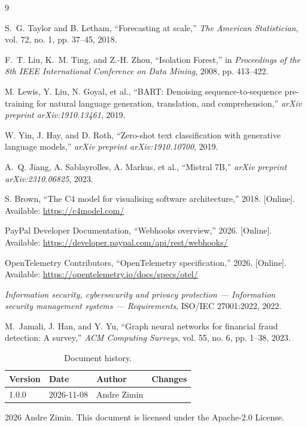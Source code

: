 \documentclass[11pt,a4paper]{article}
\begin{document}
\begin{thebibliography}{9}

S.~G. Taylor and B. Letham, ``Forecasting at scale,'' \emph{The American Statistician}, vol. 72, no. 1, pp. 37--45, 2018.

F.~T. Liu, K.~M. Ting, and Z.-H. Zhou, ``Isolation Forest,'' in \emph{Proceedings of the 8th IEEE International Conference on Data Mining}, 2008, pp. 413--422.

M. Lewis, Y. Liu, N. Goyal, et al., ``BART: Denoising sequence-to-sequence pre-training for natural language generation, translation, and comprehension,'' \emph{arXiv preprint arXiv:1910.13461}, 2019.

W. Yin, J. Hay, and D. Roth, ``Zero-shot text classification with generative language models,'' \emph{arXiv preprint arXiv:1910.10700}, 2019.

A.~Q. Jiang, A. Sablayrolles, A. Markus, et al., ``Mistral 7B,'' \emph{arXiv preprint arXiv:2310.06825}, 2023.

S. Brown, ``The C4 model for visualising software architecture,'' 2018. [Online]. Available: \url{https://c4model.com/}

PayPal Developer Documentation, ``Webhooks overview,'' 2026. [Online]. Available: \url{https://developer.paypal.com/api/rest/webhooks/}

OpenTelemetry Contributors, ``OpenTelemetry specification,'' 2026. [Online]. Available: \url{https://opentelemetry.io/docs/specs/otel/}

\emph{Information security, cybersecurity and privacy protection --- Information security management systems --- Requirements}, ISO/IEC 27001:2022, 2022.

M.~Jamali, J. Han, and Y. Yu, ``Graph neural networks for financial fraud detection: A survey,'' \emph{ACM Computing Surveys}, vol. 55, no. 6, pp. 1--38, 2023.

\end{thebibliography}


\vfill

\begin{table}[h]
  \centering
  \begin{tabular}{lllp{6cm}}
  \toprule
  \textbf{Version} & \textbf{Date} & \textbf{Author} & \textbf{Changes} \\
  \midrule
  1.0.0 & 2026-11-08 & Andre Zimin \\
  \bottomrule
  \end{tabular}
  \caption{Document history.}
\end{table}

\vspace{1cm}
\begin{center}
  \small \textcopyright{} 2026 Andre Zimin. This document is licensed under the Apache-2.0 License.
\end{center}
\end{document}
